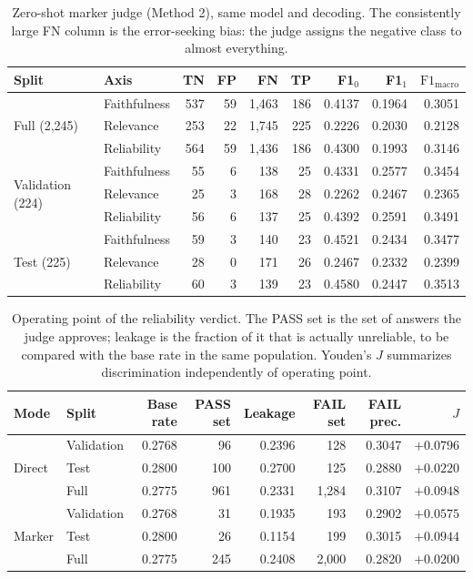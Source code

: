 \documentclass{zapiski}
\newcommand{\fmacro}{\mathrm{F1}_{\mathrm{macro}}}
\begin{document}
\begin{table}[H]
\centering
\caption{Zero-shot marker judge (Method 2), same model and decoding. The
consistently large FN column is the error-seeking bias: the judge assigns the
negative class to almost everything.}
\label{tab:marker-confusion}
\footnotesize
\begin{tabular}{llrrrrrrr}
\toprule
Split & Axis & TN & FP & FN & TP & F1$_0$ & F1$_1$ & $\fmacro$ \\
\midrule
\multirow{3}{*}{Full (2,245)}
 & Faithfulness & 537 & 59 & 1{,}463 & 186 & 0.4137 & 0.1964 & 0.3051 \\
 & Relevance    & 253 & 22 & 1{,}745 & 225 & 0.2226 & 0.2030 & 0.2128 \\
 & Reliability  & 564 & 59 & 1{,}436 & 186 & 0.4300 & 0.1993 & 0.3146 \\
\midrule
\multirow{3}{*}{Validation (224)}
 & Faithfulness &  55 &  6 & 138 &  25 & 0.4331 & 0.2577 & 0.3454 \\
 & Relevance    &  25 &  3 & 168 &  28 & 0.2262 & 0.2467 & 0.2365 \\
 & Reliability  &  56 &  6 & 137 &  25 & 0.4392 & 0.2591 & 0.3491 \\
\midrule
\multirow{3}{*}{Test (225)}
 & Faithfulness &  59 &  3 & 140 &  23 & 0.4521 & 0.2434 & 0.3477 \\
 & Relevance    &  28 &  0 & 171 &  26 & 0.2467 & 0.2332 & 0.2399 \\
 & Reliability  &  60 &  3 & 139 &  23 & 0.4580 & 0.2447 & 0.3513 \\
\bottomrule
\end{tabular}
\end{table}

\begin{table}[H]
\centering
\caption{Operating point of the reliability verdict. The PASS set is the set
of answers the judge approves; leakage is the fraction of it that is actually
unreliable, to be compared with the base rate in the same population.
Youden's $J$ summarizes discrimination independently of operating point.}
\label{tab:operating-point}
\footnotesize
\begin{tabular}{llrrrrrr}
\toprule
Mode & Split & Base rate & PASS set & Leakage & FAIL set & FAIL prec. & $J$ \\
\midrule
\multirow{3}{*}{Direct}
 & Validation & 0.2768 &  96 & 0.2396 &  128 & 0.3047 & $+0.0796$ \\
 & Test       & 0.2800 & 100 & 0.2700 &  125 & 0.2880 & $+0.0220$ \\
 & Full       & 0.2775 & 961 & 0.2331 & 1{,}284 & 0.3107 & $+0.0948$ \\
\midrule
\multirow{3}{*}{Marker}
 & Validation & 0.2768 &  31 & 0.1935 &  193 & 0.2902 & $+0.0575$ \\
 & Test       & 0.2800 &  26 & 0.1154 &  199 & 0.3015 & $+0.0944$ \\
 & Full       & 0.2775 & 245 & 0.2408 & 2{,}000 & 0.2820 & $+0.0200$ \\
\bottomrule
\end{tabular}
\end{table}
\end{document}
